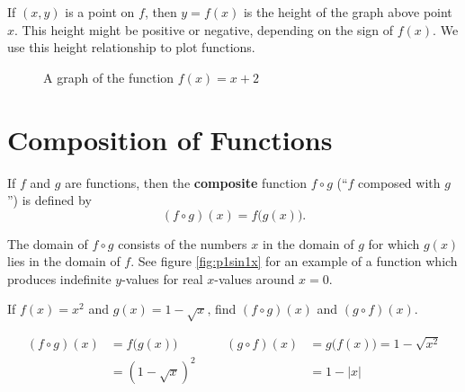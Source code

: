 If \( (x,y) \) is a point on \(f\), then \(y=f(x)\) is the height of the graph above point \(x\).
This height might be positive or negative, depending on the sign of \(f(x)\).
We use this height relationship to plot functions.
\begin{figure}[H]
    \begin{center}
      \caption{A graph of the function \(f(x)=x+2\)}
    \end{center}
  \end{figure}

\section{Composition of Functions}
\label{sec:compositefunctions}
\begin{defn}
  If \(f\) and \(g\) are functions, then the \textbf{composite} function \(f \circ g\) (``\(f\) composed with \(g\)'') is defined by
  \[ (f \circ g)(x)=f\bigl(g(x)\bigr) \text{.} \]
  \begin{remark}
    The domain of \( f \circ g \) consists of the numbers \(x\) in the domain of \(g\) for which \(g(x)\) lies in the domain of \(f\). See figure \ref{fig:p1sin1x} for an example of a function which produces indefinite $y$-values for real $x$-values around $x=0$.
  \end{remark}
\end{defn}
\begin{ex}
  If
  \(f(x)=x^2\)
  and
  \(g(x)=1-\sqrt{x}\text{,}\)
  find \( (f \circ g)(x) \) and \( (g \circ f)(x)\).
  \begin{sol}
    \begin{align*}
      (f \circ g)(x)
      &=f\big(g(x)\big)
      &&&
      (g \circ f)(x)
      &=g\big(f(x)\big)=1-\sqrt{x^2}
      \\
      &=(1-\sqrt{x})^2
      &&&
      &= 1-|x|
    \end{align*}
  \end{sol}
\end{ex}

